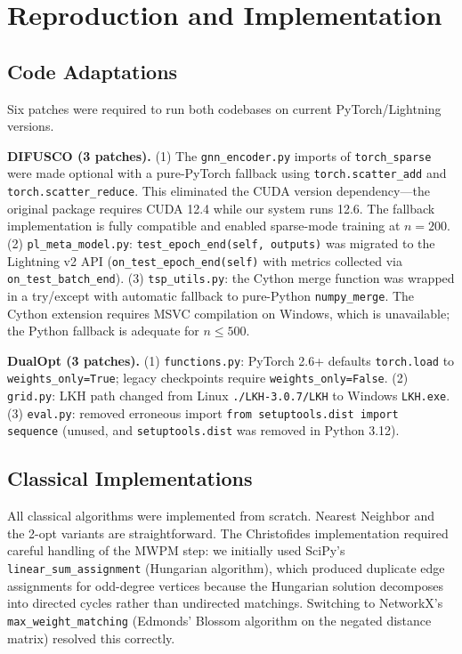 \documentclass[11pt,a4paper]{article}
\begin{document}
\section{Reproduction and Implementation}

\subsection{Code Adaptations}

Six patches were required to run both codebases on current PyTorch/Lightning versions.

\textbf{DIFUSCO (3 patches).} (1) The \texttt{gnn\_encoder.py} imports of \texttt{torch\_sparse} were made optional with a pure-PyTorch fallback using \texttt{torch.scatter\_add} and \texttt{torch.scatter\_reduce}. This eliminated the CUDA version dependency---the original package requires CUDA 12.4 while our system runs 12.6. The fallback implementation is fully compatible and enabled sparse-mode training at $n=200$. (2) \texttt{pl\_meta\_model.py}: \texttt{test\_epoch\_end(self, outputs)} was migrated to the Lightning v2 API (\texttt{on\_test\_epoch\_end(self)} with metrics collected via \texttt{on\_test\_batch\_end}). (3) \texttt{tsp\_utils.py}: the Cython merge function was wrapped in a try/except with automatic fallback to pure-Python \texttt{numpy\_merge}. The Cython extension requires MSVC compilation on Windows, which is unavailable; the Python fallback is adequate for $n \leq 500$.

\textbf{DualOpt (3 patches).} (1) \texttt{functions.py}: PyTorch 2.6+ defaults \texttt{torch.load} to \texttt{weights\_only=True}; legacy checkpoints require \texttt{weights\_only=False}. (2) \texttt{grid.py}: LKH path changed from Linux \texttt{./LKH-3.0.7/LKH} to Windows \texttt{LKH.exe}. (3) \texttt{eval.py}: removed erroneous import \texttt{from setuptools.dist import sequence} (unused, and \texttt{setuptools.dist} was removed in Python 3.12).

\subsection{Classical Implementations}

All classical algorithms were implemented from scratch. Nearest Neighbor and the 2-opt variants are straightforward. The Christofides implementation required careful handling of the MWPM step: we initially used SciPy's \texttt{linear\_sum\_assignment} (Hungarian algorithm), which produced duplicate edge assignments for odd-degree vertices because the Hungarian solution decomposes into directed cycles rather than undirected matchings. Switching to NetworkX's \texttt{max\_weight\_matching} (Edmonds' Blossom algorithm on the negated distance matrix) resolved this correctly.
\end{document}
